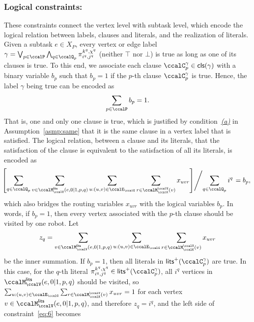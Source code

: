 \documentclass[Afour,sageh,times]{sagej}
\newcommand{\clause}[1]{\mathsf{cls}(#1)}
\renewcommand{\ap}[3]{\mathcal{\pi}_{{#1},{#2}}^{#3}}
\begin{document}
{{{  \subsubsection{Logical constraints:}\label{sec:labelconstraints} These constraints connect the vertex level with subtask level, which encode the logical relation between labels, clauses and literals, and the realization of literals.
                {Given a subtask $e\in X_P$, every vertex or edge label  $\gamma  = \bigvee_{p\in \ccalP} \bigwedge_{q\in \ccalQ_p} \ap{i^q}{j^q}{k^q,\chi^q}$ (neither $\top$ nor $\bot$) is true as long as one of its clauses is true.  To this end, we associate each clause  $\ccalC_{p}^{\gamma} \in \clause{\gamma}$ with a binary variable $b_p$ such that $b_p=1$ if the $p$-th clause  $\ccalC_{p}^{\gamma}$ is true. Hence, the label $\gamma$ being true can be encoded as
\begin{align}\label{eq:c}
   \sum_{p  \in \ccalP} b_p = 1.
\end{align}
That is, one and only one clause is true, which is justified by condition~\hyperref[asmp:a]{\it (a)} in  Assumption~\ref{asmp:same} that it is the same clause in a vertex label that is satisfied. The logical relation, between a clause and its literals, that the satisfaction of the clause is equivalent to the satisfaction of all its literals, is encoded as
\makeatletter\def\f@size{9}\check@mathfonts
\def\maketag@@@#1{\hbox{\m@th\normalsize\normalfont#1}}%
\begin{align}
 \!\!\!  \left. \left[ \sum_{q\in \ccalQ_p} \sum_{v \in \ccalM^\mathsf{lits}_{\ccalV}(e,0|1,p,q)} \sum_{u: (u,v) \in \ccalE_\ccalG} \sum_{r\in \ccalM^\ccalV_{\ccalK}(v)} x_{uvr} \right] \middle/ {\sum_{q\in \ccalQ_p} i^q} \right.= b_p, \label{eq:6}
\end{align}
which also bridges the routing variables $x_{uvr}$ with the logical variables $b_p$. In words, if $b_p=1$, then every vertex associated with the $p$-th clause should be visited by one robot.
{Let $$z_{q} = \sum_{v \in \ccalM^\mathsf{lits}_{\ccalV}(e,0|1,p,q)} \sum_{u: (u,v) \in \ccalE_\ccalG} \sum_{r\in \ccalM^\ccalV_{\ccalK}(v)} x_{uvr}$$ be the inner summation. If $b_p=1$, then all literals in $\mathsf{lits}^+(\ccalC_p^{\gamma})$ are true. In this case, for the $q$-th literal $\ap{i^q}{j^q}{k^q,\chi^q} \in \mathsf{lits}^+(\ccalC_p^\gamma)$, all $i^q$ vertices in ${\ccalM^\mathsf{lits}_{\ccalV}(e,0|1,p,q)}$ should be visited, so $\sum_{u: (u,v) \in \ccalE_\ccalG} \sum_{r\in \ccalM^\ccalV_{\ccalK}(v)} x_{uvr} = 1$ for each vertex $v \in {\ccalM^\mathsf{lits}_{\ccalV}(e,0|1,p,q)}$, and therefore $z_{q}= i^q$, and the left side of constraint~\eqref{eq:6} becomes
}}}}}
\end{document}
